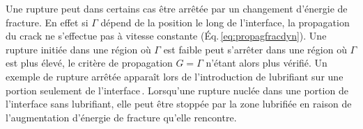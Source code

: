 








Une rupture peut dans certains cas être arrêtée par un changement d'énergie de fracture. En effet si $\Gamma$ dépend de la position le long de l'interface, la propagation du crack ne s'effectue pas à vitesse constante (Éq.\,\ref{eq:propagfracdyn}). Une rupture initiée dans une région où $\Gamma$ est faible peut s'arrêter dans une région où $\Gamma$ est plus élevé, le critère de propagation $G=\Gamma$ n'étant alors plus vérifié. Un exemple de rupture arrêtée apparaît lors de l'introduction de lubrifiant sur une portion seulement de l'interface\,\cite{bayart_slippery_2016, bayart_rupture_2018}. Lorsqu'une rupture nuclée dans une portion de l'interface sans lubrifiant, elle peut être stoppée par la zone lubrifiée en raison de l'augmentation d'énergie de fracture qu'elle rencontre.


